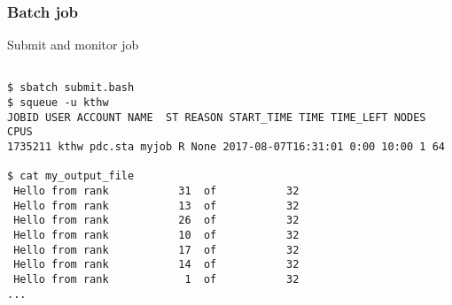 \begin{frame}[fragile]
  \frametitle{Batch job}
  \begin{alertblock}{Submit and monitor job}
    \verbatimfont{\footnotesize}
    \begin{verbatim}

$ sbatch submit.bash
$ squeue -u kthw
JOBID USER ACCOUNT NAME  ST REASON START_TIME TIME TIME_LEFT NODES CPUS
1735211 kthw pdc.sta myjob R None 2017-08-07T16:31:01 0:00 10:00 1 64

$ cat my_output_file
 Hello from rank           31  of           32
 Hello from rank           13  of           32
 Hello from rank           26  of           32
 Hello from rank           10  of           32
 Hello from rank           17  of           32
 Hello from rank           14  of           32
 Hello from rank            1  of           32
...


 \end{verbatim}
\end{alertblock}


\end{frame}



